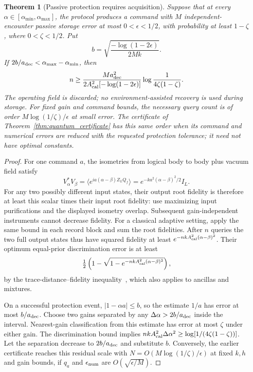 \documentclass[11pt]{article}
\newtheorem{theorem}{Theorem}[section]
\theoremstyle{definition}
\theoremstyle{remark}
\begin{document}
\begin{theorem}[Passive protection requires acquisition]
\label{thm:protection_acquisition}
Suppose that at every $\alpha\in[\alpha_{\min},\alpha_{\max}]$,
the protocol produces a command with $M$ independent-encounter passive
storage error at most $0<\epsilon<1/2$, with probability at least
$1-\zeta$, where $0<\zeta<1/2$. Put
\[
 b=\sqrt{\frac{-\log(1-2\epsilon)}{2Mk}}.
\]
If $2b/a_{\rm dec}<\alpha_{\max}-\alpha_{\min}$, then
\begin{equation}
 n\ge
 \frac{M a_{\rm dec}^2}{2A_{\rm cal}^2[-\log(1-2\epsilon)]}
       \log\frac1{4\zeta(1-\zeta)}.
 \label{eq:necessary_acquisition}
\end{equation}
The operating field is discarded; no environment-assisted recovery is
used during storage. For fixed gain and command bounds, the necessary query count is
of order $M\log(1/\zeta)/\epsilon$ at small error. The
certificate of Theorem~\ref{thm:quantum_certificate} has this same
order when its command and numerical errors are reduced with
the requested protection tolerance; it need not have optimal constants.
\end{theorem}
\begin{proof}
For one command $a$, the isometries from logical body to body plus
vacuum field satisfy
\[
 V_\alpha^*V_\beta
 =\langle e^{ia(\alpha-\beta)Z_LQ_f}\rangle
 =e^{-ka^2(\alpha-\beta)^2/2}I_L.
\]
For any two possibly different input states, their output root
fidelity is therefore at least this scalar times their input root
fidelity: use maximizing input purifications and the displayed
isometry overlap. Subsequent gain-independent instruments cannot
decrease fidelity. For a classical adaptive setting, apply the
same bound in each record block and sum the root fidelities.
After $n$ queries the two full output states thus have squared
fidelity at least $e^{-nkA_{\rm cal}^2(\alpha-\beta)^2}$.
Their optimum equal-prior discrimination error is at least
\[
 \tfrac12\left(1-
    \sqrt{1-e^{-nkA_{\rm cal}^2(\alpha-\beta)^2}}\right),
\]
by the trace-distance--fidelity inequality~\cite{FuchsGraaf1998}, which also applies to
ancillas and mixtures.

On a successful protection event, $|1-\alpha a|\le b$,
so the estimate $1/a$ has error at most $b/a_{\rm dec}$.
Choose two gains separated by any
$\Delta\alpha>2b/a_{\rm dec}$ inside the interval. Nearest-gain
classification from this estimate has error at most $\zeta$ under
either gain. The discrimination bound implies
$nkA_{\rm cal}^2\Delta\alpha^2\ge
 \log[1/(4\zeta(1-\zeta))]$.
Let the separation decrease to $2b/a_{\rm dec}$ and substitute $b$.
Conversely, the earlier certificate reaches this residual scale with
$N=O(M\log(1/\zeta)/\epsilon)$ at fixed $k,h$ and gain bounds,
if $q_a$ and $\epsilon_{\rm num}$ are $O(\sqrt{\epsilon/M})$.
\end{proof}
\end{document}
